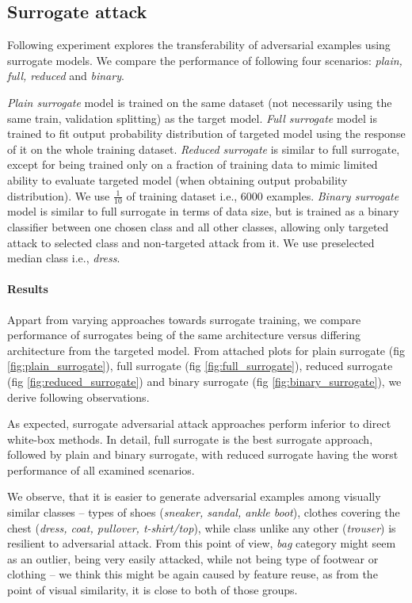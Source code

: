 \subsection{Surrogate attack}
\label{sec:surrogate_fgsm}
Following experiment explores the transferability of adversarial examples using surrogate models. We compare the performance of following four scenarios: \emph{plain, full, reduced} and \emph{binary}.

\emph{Plain surrogate} model is trained on the same dataset (not necessarily using the same train, validation splitting) as the target model. \emph{Full surrogate} model is trained to fit output probability distribution of targeted model using the response of it on the whole training dataset. \emph{Reduced surrogate} is similar to full surrogate, except for being trained only on a fraction of training data to mimic limited ability to evaluate targeted model (when obtaining output probability distribution). We use $\frac{1}{10}$ of training dataset i.e., 6000 examples. \emph{Binary surrogate} model is similar to full surrogate in terms of data size, but is trained as a binary classifier between one chosen class and all other classes, allowing only targeted attack to selected class and non-targeted attack from it. We use preselected median class i.e., \emph{dress}.

\paragraph{Results}
Appart from varying approaches towards surrogate training, we compare performance of surrogates being of the same architecture versus differing architecture from the targeted model. From attached plots for plain surrogate (fig \ref{fig:plain_surrogate}), full surrogate (fig \ref{fig:full_surrogate}), reduced surrogate (fig \ref{fig:reduced_surrogate}) and binary surrogate (fig \ref{fig:binary_surrogate}), we derive following observations.

As expected, surrogate adversarial attack approaches perform inferior to direct white-box methods. In detail, full surrogate is the best surrogate approach, followed by plain and binary surrogate, with reduced surrogate having the worst performance of all examined scenarios.

We observe, that it is easier to generate adversarial examples among visually similar classes -- types of shoes (\emph{sneaker, sandal, ankle boot}), clothes covering the chest (\emph{dress, coat, pullover, t-shirt/top}), while class unlike any other (\emph{trouser}) is resilient to adversarial attack. From this point of view, \textit{bag} category might seem as an outlier, being very easily attacked, while not being type of footwear or clothing -- we think this might be again caused by feature reuse, as from the point of visual similarity, it is close to both of those groups.


